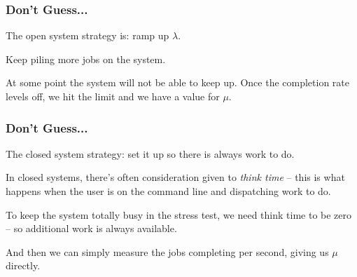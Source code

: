 \begin{frame}
\frametitle{Don't Guess...}

The open system strategy is: ramp up $\lambda$. 

Keep piling more jobs on the system. 

At some point the system will not be able to keep up. Once the completion rate levels off, we hit the limit and we have a value for $\mu$.


\end{frame}



\begin{frame}
\frametitle{Don't Guess...}

The closed system strategy: set it up so there is always work to do. 

In closed systems, there's often consideration given to \textit{think time} -- this is what happens when the user is on the command line and dispatching work to do. 

To keep the system totally busy in the stress test, we need think time to be zero -- so additional work is always available. 

And then we can simply measure the jobs completing per second, giving us $\mu$ directly.


\end{frame}






